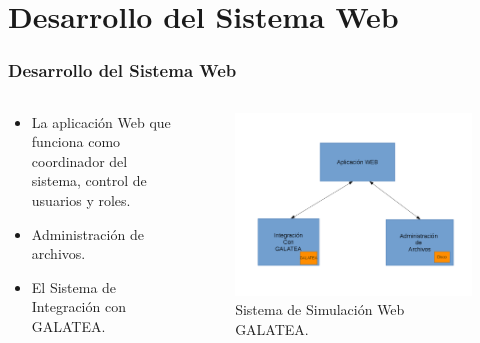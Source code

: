 \documentclass[spanish,xcolor=dvipsnames]{beamer}
\begin{document}
    \section{Desarrollo del Sistema Web}
    \begin{frame}
    	\frametitle{Desarrollo del Sistema Web}
    	
    	\begin{columns}
    		\begin{column}{.5\linewidth}
    			\begin{itemize}
    				\item La aplicación Web que funciona como coordinador del sistema, control de usuarios y roles.
    				\item Administración de archivos.
    				\item El Sistema de Integración con GALATEA.
    			\end{itemize}
    		\end{column}
    		\begin{column}{.5\linewidth}
    			\begin{figure}[H]
    				\centering
    				\includegraphics[scale=0.23]{img/estructuraSistema.png}
    				\caption{Sistema de Simulación Web GALATEA.}
    				\label{estructuraSistema}
    			\end{figure}
    		\end{column}
    	\end{columns}
    	
    \end{frame}
\end{document}

